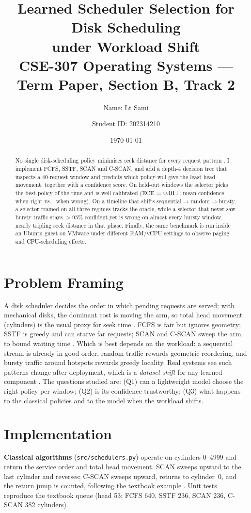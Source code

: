 \documentclass[10pt,a4paper]{article}
\title{\vspace{-1.2cm}\textbf{Learned Scheduler Selection for Disk Scheduling\\under Workload Shift}\\[2pt]
\large CSE-307 Operating Systems --- Term Paper, Section B, Track 2}
\author{Name: Lt Sami}
\author{Student ID: 202314210}
\date{\today}
\begin{document}
\maketitle\vspace{-0.6cm}

\begin{abstract}\noindent
No single disk-scheduling policy minimises seek distance for every request pattern
\cite{teorey1972,worthington1994}. I implement FCFS, SSTF, SCAN and C-SCAN, and add a
depth-4 decision tree that inspects a 40-request window and predicts which policy will give
the least head movement, together with a confidence score. On held-out windows the selector
picks the best policy \TestAcc{} of the time and is well calibrated (ECE $=0.011$; mean confidence
\ConfOK{} when right vs.\ \ConfBad{} when wrong). On a timeline that shifts
sequential$\rightarrow$random$\rightarrow$bursty, a selector trained on all three regimes tracks the
oracle, while a selector that never saw bursty traffic stays $>$95\% confident yet is wrong on
almost every bursty window, nearly tripling seek distance in that phase. Finally, the same
benchmark is run inside an Ubuntu guest on VMware under different RAM/vCPU settings to observe
paging and CPU-scheduling effects.
\end{abstract}

\section{Problem Framing}
A disk scheduler decides the order in which pending requests are served; with mechanical
disks, the dominant cost is moving the arm, so total head movement (cylinders) is the usual
proxy for seek time \cite{silberschatz2018,ostep}. FCFS is fair but ignores geometry; SSTF is
greedy and can starve far requests; SCAN and C-SCAN sweep the arm to bound waiting time
\cite{silberschatz2018}. Which is best depends on the workload: a sequential stream is already
in good order, random traffic rewards geometric reordering, and bursty traffic around hotspots
rewards greedy locality. Real systems see such patterns change after deployment, which is a
\emph{dataset shift} for any learned component \cite{quinonero2009}. The questions studied are:
(Q1) can a lightweight model choose the right policy per window; (Q2) is its confidence
trustworthy; (Q3) what happens to the classical policies and to the model when the workload
shifts.

\section{Implementation}
\textbf{Classical algorithms} (\texttt{src/schedulers.py}) operate on cylinders 0--4999 and
return the service order and total head movement. SCAN sweeps upward to the last cylinder and
reverses; C-SCAN sweeps upward, returns to cylinder~0, and the return jump is counted, following
the textbook example \cite{silberschatz2018}. Unit tests reproduce the textbook queue
(head 53; FCFS 640, SSTF 236, SCAN 236, C-SCAN 382 cylinders).
\end{document}
